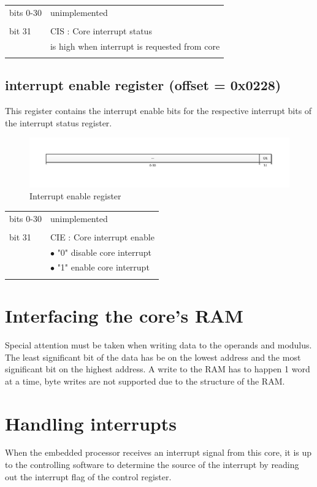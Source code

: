 \begin{tabular}{ll}
bits 0-30	& unimplemented\\
			&\\
bit 31 		& CIS : Core interrupt status\\
 			& is high when interrupt is requested from core\\
 			&\\
\end{tabular}

\subsection{interrupt enable register (offset = 0x0228)}
This register contains the interrupt enable bits for the respective interrupt bits of the interrupt status register.\\
\begin{figure}[H]
\centering
\includegraphics[trim=1.2cm 1.2cm 1.2cm 1.2cm, width=15cm]{pictures/plb_ie_reg.pdf}
\caption{Interrupt enable register}
\end{figure}
\begin{tabular}{ll}
bits 0-30	& unimplemented\\
			&\\
bit 31 		& CIE : Core interrupt enable\\
 			& $\bullet$  "0" disable core interrupt\\
 			& $\bullet$  "1" enable core interrupt\\
 			&\\
\end{tabular}

\section{Interfacing the core's RAM}
Special attention must be taken when writing data to the operands and modulus. The least significant bit of the data has be on the lowest
address and the most significant bit on the highest address. A write to the RAM has to happen 1 word at a time, byte writes are not
supported due to the structure of the RAM.

\section{Handling interrupts}
When the embedded processor receives an interrupt signal from this core, it is up to the controlling software to
determine the source of the interrupt by reading out the interrupt flag of the control register.